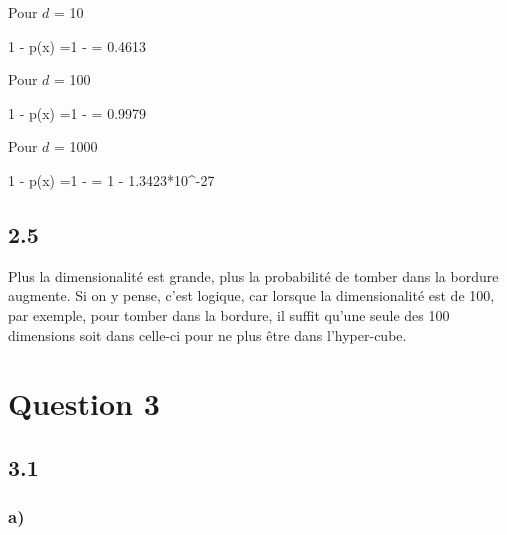 \documentclass[12pt]{article}
\newenvironment{eqs*}{\begin{equation*}\begin{aligned}}{\end{aligned}\end{equation*}}
\begin{document}
Pour $d$ = 10
\begin{eqs*}
1 - p(x) =1 -  = 0.4613
\end{eqs*}

Pour $d$ = 100
\begin{eqs*}
1 - p(x) =1 -  = 0.9979
\end{eqs*}

Pour $d$ = 1000
\begin{eqs*}
1 - p(x) =1 -  = 1 - 1.3423*10^{-27}
\end{eqs*}

\newpage
\subsection{2.5}

Plus la dimensionalité est grande, plus la probabilité de tomber dans la bordure augmente. Si on y pense, c'est logique, car lorsque la dimensionalité est de 
100, par exemple, pour tomber dans la bordure, il suffit qu'une seule des 100 dimensions soit dans celle-ci pour ne plus être dans l'hyper-cube. 

\section{Question 3}
\subsection{3.1}
\subsubsection{a)}
\end{document}
